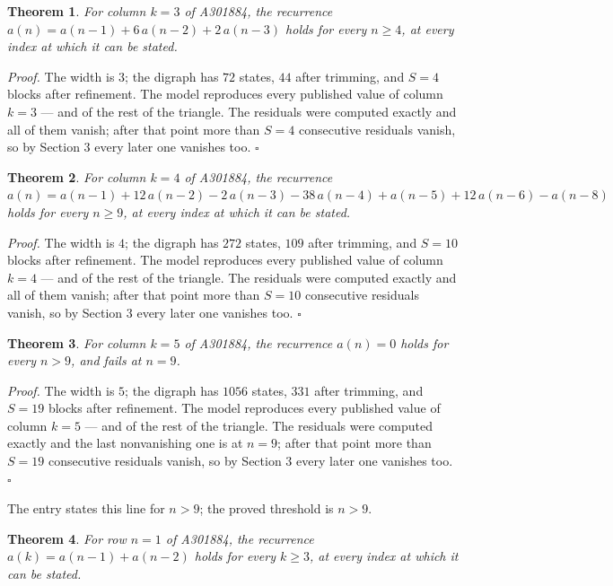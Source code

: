 \documentclass[11pt]{article}
\newtheorem{theorem}{Theorem}
\theoremstyle{definition}
\begin{document}
\begin{theorem} For column $k = 3$ of A301884, the recurrence $a(n) = a(n-1) + 6\,a(n-2) + 2\,a(n-3)$ holds for every $n \ge 4$, at every index at which it can be stated.\end{theorem}

{\itshape Proof.} The width is $3$; the digraph has $72$ states, $44$ after trimming, and $S = 4$ blocks after refinement. The model reproduces every published value of column $k = 3$ --- and of the rest of the triangle. The residuals were computed exactly and all of them vanish; after that point more than $S = 4$ consecutive residuals vanish, so by Section 3 every later one vanishes too. $\square$

\begin{theorem} For column $k = 4$ of A301884, the recurrence $a(n) = a(n-1) + 12\,a(n-2) - 2\,a(n-3) - 38\,a(n-4) + a(n-5) + 12\,a(n-6) - a(n-8)$ holds for every $n \ge 9$, at every index at which it can be stated.\end{theorem}

{\itshape Proof.} The width is $4$; the digraph has $272$ states, $109$ after trimming, and $S = 10$ blocks after refinement. The model reproduces every published value of column $k = 4$ --- and of the rest of the triangle. The residuals were computed exactly and all of them vanish; after that point more than $S = 10$ consecutive residuals vanish, so by Section 3 every later one vanishes too. $\square$

\begin{theorem} For column $k = 5$ of A301884, the recurrence $a(n) = 0$ holds for every $n > 9$, and fails at $n = 9$.\end{theorem}

{\itshape Proof.} The width is $5$; the digraph has $1056$ states, $331$ after trimming, and $S = 19$ blocks after refinement. The model reproduces every published value of column $k = 5$ --- and of the rest of the triangle. The residuals were computed exactly and the last nonvanishing one is at $n = 9$; after that point more than $S = 19$ consecutive residuals vanish, so by Section 3 every later one vanishes too. $\square$

The entry states this line for $n > 9$; the proved threshold is $n > 9$.

\begin{theorem} For row $n = 1$ of A301884, the recurrence $a(k) = a(n-1) + a(n-2)$ holds for every $k \ge 3$, at every index at which it can be stated.\end{theorem}
\end{document}
